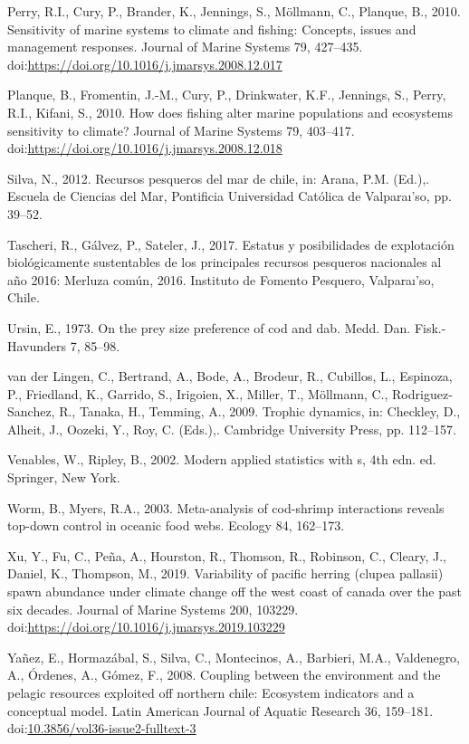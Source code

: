 \documentclass[12pt]{article}
\begin{document}
\leavevmode\hypertarget{ref-PERRY2010427}{}%
Perry, R.I., Cury, P., Brander, K., Jennings, S., Möllmann, C., Planque,
B., 2010. Sensitivity of marine systems to climate and fishing:
Concepts, issues and management responses. Journal of Marine Systems 79,
427--435.
doi:\href{https://doi.org/https://doi.org/10.1016/j.jmarsys.2008.12.017}{https://doi.org/10.1016/j.jmarsys.2008.12.017}

\leavevmode\hypertarget{ref-PLANQUE2010403}{}%
Planque, B., Fromentin, J.-M., Cury, P., Drinkwater, K.F., Jennings, S.,
Perry, R.I., Kifani, S., 2010. How does fishing alter marine populations
and ecosystems sensitivity to climate? Journal of Marine Systems 79,
403--417.
doi:\href{https://doi.org/https://doi.org/10.1016/j.jmarsys.2008.12.018}{https://doi.org/10.1016/j.jmarsys.2008.12.018}

\leavevmode\hypertarget{ref-Silva2012}{}%
Silva, N., 2012. Recursos pesqueros del mar de chile, in: Arana, P.M.
(Ed.),. Escuela de Ciencias del Mar, Pontificia Universidad Católica de
Valparaı'so, pp. 39--52.

\leavevmode\hypertarget{ref-Tascheri2017}{}%
Tascheri, R., Gálvez, P., Sateler, J., 2017. Estatus y posibilidades de
explotación biológicamente sustentables de los principales recursos
pesqueros nacionales al año 2016: Merluza común, 2016. Instituto de
Fomento Pesquero, Valparaı'so, Chile.

\leavevmode\hypertarget{ref-Ursin1973}{}%
Ursin, E., 1973. On the prey size preference of cod and dab. Medd. Dan.
Fisk.-Havunders 7, 85--98.

\leavevmode\hypertarget{ref-vanderLingen2009}{}%
van der Lingen, C., Bertrand, A., Bode, A., Brodeur, R., Cubillos, L.,
Espinoza, P., Friedland, K., Garrido, S., Irigoien, X., Miller, T.,
Möllmann, C., Rodriguez-Sanchez, R., Tanaka, H., Temming, A., 2009.
Trophic dynamics, in: Checkley, D., Alheit, J., Oozeki, Y., Roy, C.
(Eds.),. Cambridge University Press, pp. 112--157.

\leavevmode\hypertarget{ref-VenablesRipley:2002}{}%
Venables, W., Ripley, B., 2002. Modern applied statistics with s, 4th
edn. ed. Springer, New York.

\leavevmode\hypertarget{ref-Worm:2003}{}%
Worm, B., Myers, R.A., 2003. Meta-analysis of cod-shrimp interactions
reveals top-down control in oceanic food webs. Ecology 84, 162--173.

\leavevmode\hypertarget{ref-XU2019103229}{}%
Xu, Y., Fu, C., Peña, A., Hourston, R., Thomson, R., Robinson, C.,
Cleary, J., Daniel, K., Thompson, M., 2019. Variability of pacific
herring (clupea pallasii) spawn abundance under climate change off the
west coast of canada over the past six decades. Journal of Marine
Systems 200, 103229.
doi:\href{https://doi.org/https://doi.org/10.1016/j.jmarsys.2019.103229}{https://doi.org/10.1016/j.jmarsys.2019.103229}

\leavevmode\hypertarget{ref-Yanez2008}{}%
Yañez, E., Hormazábal, S., Silva, C., Montecinos, A., Barbieri, M.A.,
Valdenegro, A., Órdenes, A., Gómez, F., 2008. Coupling between the
environment and the pelagic resources exploited off northern chile:
Ecosystem indicators and a conceptual model. Latin American Journal of
Aquatic Research 36, 159--181.
doi:\href{https://doi.org/10.3856/vol36-issue2-fulltext-3}{10.3856/vol36-issue2-fulltext-3}
\end{document}
